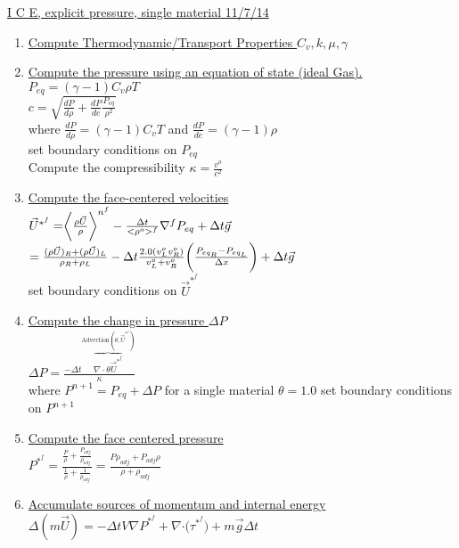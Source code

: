 \documentclass[fleqn]{article}
\newcommand{\B}[1]      {\biggr{#1}}
\newcommand{\U}         {{\vec{U}}}
\newcommand{\rhoM}      {\ensuremath{\rho^{o}}}
\newcommand{\delt}      {\ensuremath{\Delta{t}} }
\newcommand{\sv}[1]     {\ensuremath{v^o_{{#1}} }}
\begin{document}
\setlength{\abovedisplayskip}{0.1in}
\setlength{\mathindent}{0.0in}
\doublespacing
\underline{ I C E, explicit pressure, single material  \hspace{ 0.5in}11/7/14}

\begin{enumerate}
%
\item \underline{Compute Thermodynamic/Transport Properties
$C_v, k, \mu, \gamma$}
%
\item \underline{Compute the pressure using an equation of state (ideal Gas).}\\
$P_{eq} = (\gamma -1) C_v \rho T$\\
$c = \sqrt{ \frac{dP}{d\rho} + \frac{dP}{de} \frac{P_{eq}}{\rho^2} }$\\
where
$\frac{dP}{d\rho} = (\gamma -1) C_v T$ and 
$\frac{dP}{de} = (\gamma - 1) \rho$ \\
set boundary conditions on $P_{eq}$\\
Compute the compressibility $\kappa = \frac{v^o}{c^2}$
%
\item \underline{Compute the face-centered velocities}\\
  $ \vec{U}^{*^{f}} 
    = \B{<} \frac{ \rho \U }{\rho} \B{>}^{n^{f}}
    - \frac{ \delt }{< \rhoM >^f} \nabla^{f} P_{eq}
     + \delt\vec{g} $ \\
$    
   =\frac{(\rho \U)_{R} + (\rho \U)_{L}}{\rho_{R} + \rho_{L}}
   -\delt \frac{2.0 (\sv{L} \sv{R})}  {\sv{L} + \sv{R}}  \B{(} \frac{P_{eq_R} - P_{eq_L}}{\Delta x}\B{)}
   + \delt\vec{g} $ \\
set boundary conditions on $\vec{U}^{*^{f}}$
%
\item \underline{Compute the change in pressure $\Delta P$}  \\
$     \Delta P =  
              \frac{  - \Delta{t} \overbrace{ \nabla \cdot \theta \vec{U}^{*^{f}} } ^{\text{Advection}(\theta, \vec{U}^{*^{f}}) } }
              {\kappa} $\\
where $P^{n+1} = P_{eq} + \Delta{P}$ for a single material $\theta = 1.0$
set boundary conditions on $P^{n+1}$
%
\item \underline{Compute the face centered pressure}\\
$ P^{*^{f}} = \frac{\frac{P}{\rho} + \frac{P_{adj}}{\rho_{adj}}}
                     {\frac{1}{\rho} + \frac{1}{\rho_{adj}}}
              =\frac{ {P \rho_{adj}} + {P_{adj} \rho }  }
                 { {\rho} + {\rho_{adj}  }  } $
%
\item \underline{Accumulate sources of momentum and internal energy}\\  
 $\Delta(m\vec{U}) = 
    - \delt V \nabla{ P^{*^f}} 
    + \nabla{ \cdot (\tau^{*^f}})
    + m \vec{g}\delt$
    

\end{enumerate}
\end{document}
